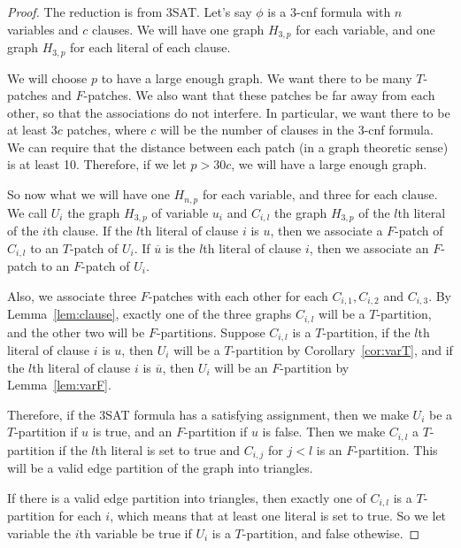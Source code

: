 \documentclass[runningheads,a4paper]{llncs}
\begin{document}
\begin{proof}

The reduction is from 3SAT. Let's say $\phi$ is a 3-cnf formula with $n$ variables and $c$ clauses. We will have one graph $H_{3,p}$ for each variable, and one graph $H_{3,p}$ for each literal of each clause. 

We will choose $p$ to have a large enough graph. We want there to be many $T$-patches and $F$-patches. We also want that these patches be far away from each other, so that the associations do not interfere. In particular, we want there to be at least $3c$ patches, where $c$ will be the number of clauses in the 3-cnf formula. We can require that the distance between each patch (in a graph theoretic sense) is at least 10. Therefore, if we let $p > 30c$, we will have a large enough graph. 

So now what we will have one $H_{n,p}$ for each variable, and three for each clause. We call $U_i$ the graph $H_{3,p}$ of variable $u_i$ and $C_{i,l}$ the graph $H_{3,p}$ of the $l$th literal of the $i$th clause. If the $l$th literal of clause $i$ is $u$, then we associate a $F$-patch of $C_{i,l}$ to an $T$-patch of $U_i$. If $\overline{u}$ is the $l$th literal of clause $i$, then we associate an $F$-patch to an $F$-patch of $U_i$. 

Also, we associate three $F$-patches with each other for each $C_{i, 1}, C_{i,2}$ and $C_{i,3}$. By Lemma~\ref{lem:clause}, exactly one of the three graphs $C_{i,l}$ will be a $T$-partition, and the other two will be $F$-partitions. Suppose $C_{i,l}$ is a $T$-partition, if the $l$th literal of clause $i$ is $u$, then $U_i$ will be a $T$-partition by Corollary~\ref{cor:varT}, and if the $l$th literal of clause $i$ is $\overline{u}$, then $U_i$ will be an $F$-partition by Lemma~\ref{lem:varF}.

Therefore, if the 3SAT formula has a satisfying assignment, then we make $U_i$ be a $T$-partition if $u$ is true, and an $F$-partition if $u$ is false. Then we make $C_{i,l}$ a $T$-partition if the $l$th literal is set to true and $C_{i, j}$ for $j < l$ is an $F$-partition. This will be a valid edge partition of the graph into triangles. 

If there is a valid edge partition into triangles, then exactly one of $C_{i,l}$ is a $T$-partition for each $i$, which means that at least one literal is set to true. So we let variable the $i$th variable be true if $U_i$ is a $T$-partition, and false othewise. 
\end{proof}



\end{document}
